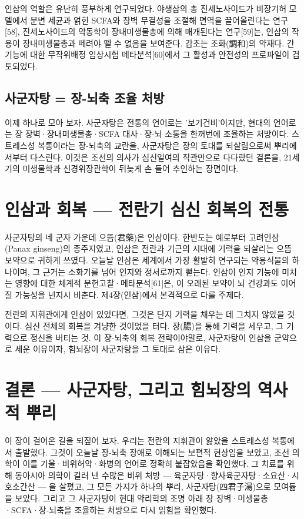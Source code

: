 \documentclass[12pt,oneside]{book}
\begin{document}
인삼의 역할은 유난히 풍부하게 연구되었다. 야생삼의 총 진세노사이드가 비장기허 모델에서 분변 세균과 얽힌 SCFA와 장벽 무결성을 조절해 면역을 끌어올린다는 연구[58], 진세노사이드의 약동학이 장내미생물총에 의해 매개된다는 연구[59]는, 인삼의 작용이 장내미생물총과 떼려야 뗄 수 없음을 보여준다. 감초는 조화(調和)의 약재다. 간 기능에 대한 무작위배정 임상시험 메타분석[60]에서 그 활성과 안전성의 프로파일이 검토되었다.

\subsection{사군자탕 = 장-뇌축 조율 처방}

이제 하나로 모아 보자. 사군자탕은 전통의 언어로는 '보기건비'이지만, 현대의 언어로는 장 장벽·장내미생물총·SCFA 대사·장-뇌 소통을 한꺼번에 조율하는 처방이다. 스트레스성 복통이라는 장-뇌축의 교란을, 사군자탕은 장의 토대를 되살림으로써 뿌리에서부터 다스린다. 이것은 조선의 의사가 심신일여의 직관만으로 다다랐던 결론을, 21세기의 미생물학과 신경위장관학이 뒤늦게 손 들어 추인하는 장면이다.

\section{인삼과 회복 — 전란기 심신 회복의 전통}

사군자탕의 네 군자 가운데 으뜸(君藥)은 인삼이다. 한반도는 예로부터 고려인삼(Panax ginseng)의 종주지였고, 인삼은 전란과 기근의 시대에 기력을 되살리는 으뜸 보약으로 귀하게 쓰였다. 오늘날 인삼은 세계에서 가장 활발히 연구되는 약용식물의 하나이며, 그 근거는 소화기를 넘어 인지와 정서로까지 뻗는다. 인삼이 인지 기능에 미치는 영향에 대한 체계적 문헌고찰·메타분석[61]은, 이 오래된 보약이 뇌 건강과도 이어질 가능성을 넌지시 비춘다. 제4장(인삼)에서 본격적으로 다룰 주제다.

전란의 지휘관에게 인삼이 있었다면, 그것은 단지 기력을 채우는 데 그치지 않았을 것이다. 심신 전체의 회복을 겨냥한 것이었을 터다. 장(腸)을 통해 기력을 세우고, 그 기력으로 정신을 버티는 것. 이 장-뇌축의 회복 전략이야말로, 사군자탕이 인삼을 군약으로 세운 이유이자, 힘뇌장이 사군자탕을 그 토대로 삼은 이유다.

\section{결론 — 사군자탕, 그리고 힘뇌장의 역사적 뿌리}

이 장이 걸어온 길을 되짚어 보자. 우리는 전란의 지휘관이 앓았을 스트레스성 복통에서 출발했다. 그것이 오늘날 장-뇌축 장애로 이해되는 보편적 현상임을 보았고, 조선 의학이 이를 기울·비위허약·화병의 언어로 정확히 붙잡았음을 확인했다. 그 치료를 위해 동아시아 의학이 길러 낸 수많은 비위 처방 — 육군자탕·향사육군자탕·소요산·시호소간산 — 을 살폈고, 그 모든 가지가 하나의 뿌리, 사군자탕(四君子湯)으로 모여듦을 보았다. 그리고 그 사군자탕이 현대 약리학의 조명 아래 장 장벽·미생물총·SCFA·장-뇌축을 조율하는 처방으로 다시 읽힘을 확인했다.
\end{document}
